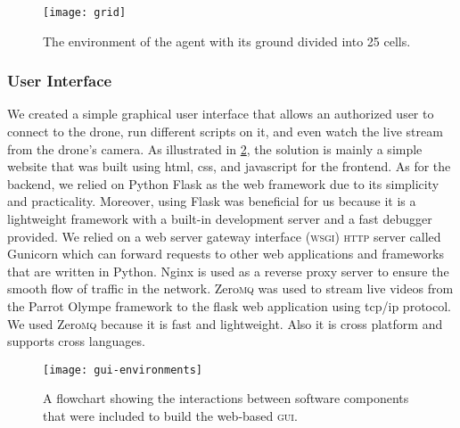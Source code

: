 \documentclass[../main.tex]{subfiles}
\begin{document}
\begin{figure}[tbp]
	\centering
	\texttt{[image: grid]}
	\caption{The environment of the agent with its ground
		divided into 25 cells.}
	\label{fig:grid}
\end{figure}

\subsubsection{User Interface}

We created a simple graphical user interface that allows an authorized user 
to connect to the drone, run different scripts on it, and even watch the live 
stream from the drone's camera. 
As illustrated in \cref{fig:gui-environments}, the solution is mainly a simple 
website that was built using html, css, and javascript for the frontend. As 
for the backend, we relied on Python Flask as the web framework due to 
its simplicity and practicality. Moreover, using Flask was beneficial for us 
because it is a lightweight framework with a built-in development server and a 
fast debugger provided. 
We relied on a web server gateway interface (\textsc{wsgi}) \textsc{http} 
server called Gunicorn which can forward requests to other web applications 
and frameworks that are written in Python.
Nginx is used as a reverse proxy server to ensure the smooth flow 
of traffic in the network. Zero\textsc{mq} was used to stream live videos from the 
Parrot Olympe framework to the flask web application using tcp/ip protocol. 
We used Zero\textsc{mq} because it is fast and lightweight. Also it is cross platform
and supports cross languages.

\begin{figure}[tbp] 
	\centering
	\texttt{[image: gui-environments]} 
        \caption{A flowchart showing the interactions between software
        components that were included to build the web-based
        \textsc{gui}.}
	\label{fig:gui-environments}  
\end{figure}
\end{document}
